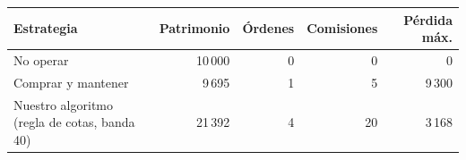 \begin{tabular}{lrrrr}
\toprule
Estrategia & Patrimonio & Órdenes & Comisiones & Pérdida máx. \\
\midrule
No operar & 10\,000 & 0 & 0 & 0 \\
Comprar y mantener & 9\,695 & 1 & 5 & 9\,300 \\
Nuestro algoritmo (regla de cotas, banda 40) & 21\,392 & 4 & 20 & 3\,168 \\
\bottomrule
\end{tabular}

